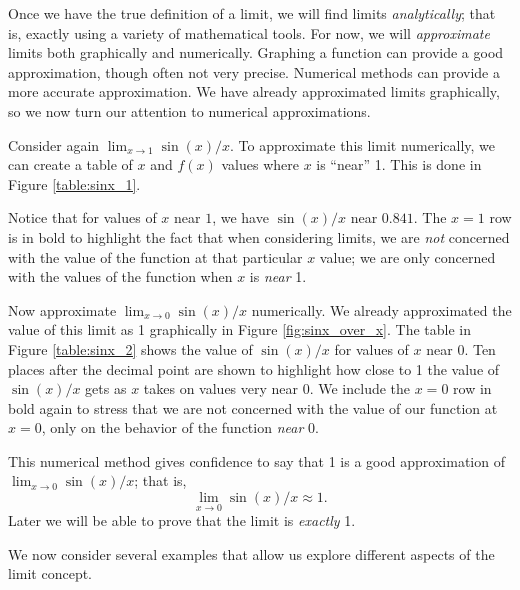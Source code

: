 Once we have the true definition of a limit, we will find limits \textit{analytically}; that is, exactly using a variety of mathematical tools. For now, we will \textit{approximate} limits both graphically and numerically. Graphing a function can provide a good approximation, though often not very precise. Numerical methods can provide a more accurate approximation. We have already approximated limits graphically, so we now turn our attention to numerical approximations.


Consider again $\lim_{x\to 1}\sin (x)/x$. To approximate this limit numerically, we can create a table of $x$ and $f(x)$ values where $x$ is ``near'' 1. This is done in Figure \ref{table:sinx_1}.\par

Notice that for values of $x$ near $1$, we have $\sin (x)/x$ near $0.841$. The $x=1$ row is in bold to highlight the fact that when considering limits, we are \textit{not} concerned with the value of the function at that particular $x$ value; we are only concerned with the values of the function when $x$ is \textit{near} 1. 



Now approximate $\lim_{x\to 0} \sin(x)/x$ numerically. We already approximated the value of this limit as 1 graphically in Figure \ref{fig:sinx_over_x}. The table in Figure \ref{table:sinx_2} shows the value of $\sin(x)/x$ for values of $x$ near 0. Ten places after the decimal point are shown to highlight how close to 1 the value of $\sin(x)/x$ gets as $x$ takes on values very near 0. We include the $x=0$ row in bold again to stress that we are not concerned with the value of our function at $x=0$, only on the behavior of the function \textit{near} 0. 

 
This numerical method gives confidence to say that 1 is a good approximation of $\lim_{x\to 0} \sin(x)/x$; that is, $$\lim_{x\to 0} \sin(x)/x \approx 1.$$ Later we will be able to prove that the limit is \textit{exactly} 1.

We now consider several examples that allow us explore different aspects of the limit concept.\\


